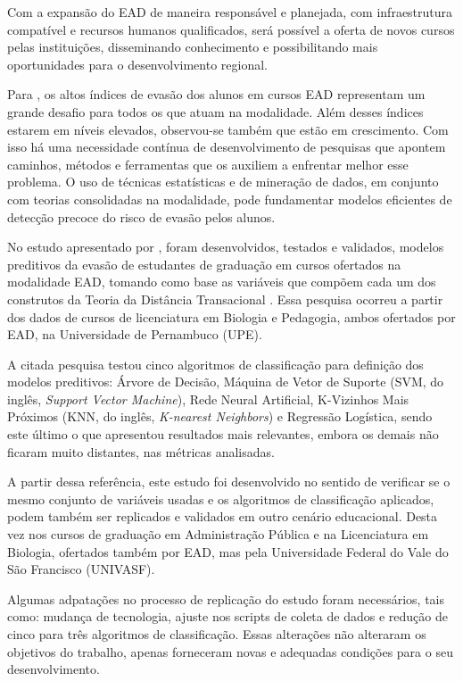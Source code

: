 Com a expansão do EAD de maneira responsável e planejada, com infraestrutura
compatível e recursos humanos qualificados, será possível a oferta de novos
cursos pelas instituições, disseminando conhecimento e possibilitando mais
oportunidades para o desenvolvimento regional.

Para , os altos índices de evasão dos alunos em
cursos EAD representam um grande desafio para todos os que atuam na modalidade.
Além desses índices estarem em níveis elevados, observou-se também que estão em
crescimento. Com isso há uma necessidade contínua de desenvolvimento de
pesquisas que apontem caminhos, métodos e ferramentas que os auxiliem a
enfrentar melhor esse problema. O uso de técnicas estatísticas e de mineração de
dados, em conjunto com teorias consolidadas na modalidade, pode fundamentar
modelos eficientes de detecção precoce do risco de evasão pelos alunos.

No estudo apresentado por , foram desenvolvidos,
testados e validados, modelos preditivos da evasão de estudantes de graduação em
cursos ofertados na modalidade EAD, tomando como base as variáveis que compõem
cada um dos construtos da Teoria da Distância Transacional
\cite{moore2008teoria}. Essa pesquisa ocorreu a partir dos dados de cursos de
licenciatura em Biologia e Pedagogia, ambos ofertados por EAD, na Universidade
de Pernambuco (UPE).

A citada pesquisa testou cinco algoritmos de classificação para definição dos
modelos preditivos: Árvore de Decisão, Máquina de Vetor de Suporte (SVM, do inglês, \textit{Support Vector Machine}), Rede
Neural Artificial, K-Vizinhos Mais Próximos (KNN, do inglês, \textit{K-nearest
Neighbors}) e Regressão Logística, sendo este último o que apresentou resultados
mais relevantes, embora os demais não ficaram muito distantes, nas métricas
analisadas.

A partir dessa referência, este estudo foi desenvolvido no sentido de verificar
se o mesmo conjunto de variáveis usadas e os algoritmos de classificação
aplicados, podem também ser replicados e validados em outro cenário educacional.
Desta vez nos cursos de graduação em Administração Pública e na Licenciatura em
Biologia, ofertados também por EAD, mas pela Universidade Federal do Vale do São
Francisco (UNIVASF).

Algumas adpatações no processo de replicação do estudo foram necessários, tais
como: mudança de tecnologia, ajuste nos scripts de coleta de dados e redução de
cinco para três algoritmos de classificação. Essas alterações não alteraram os
objetivos do trabalho, apenas forneceram novas e adequadas condições para o seu
desenvolvimento.

